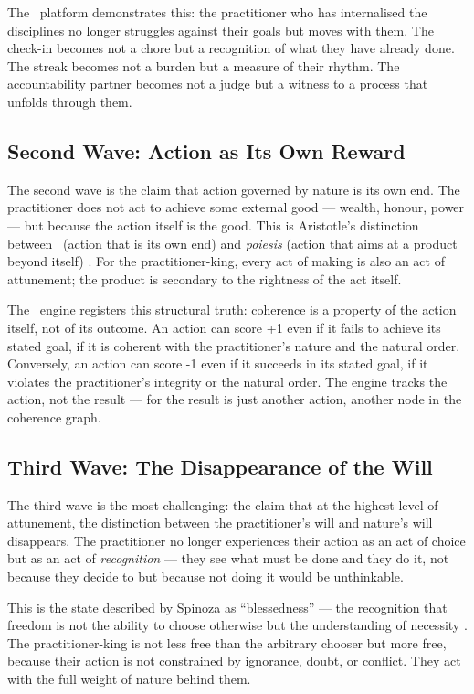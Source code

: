 The \praxis\ platform demonstrates this: the practitioner who has internalised
the disciplines no longer struggles against their goals but moves with them.
The check-in becomes not a chore but a recognition of what they have already
done. The streak becomes not a burden but a measure of their rhythm. The
accountability partner becomes not a judge but a witness to a process that
unfolds through them.

\subsection{Second Wave: Action as Its Own Reward}

The second wave is the claim that action governed by nature is its own end. The
practitioner does not act to achieve some external good --- wealth, honour,
power --- but because the action itself is the good. This is Aristotle's
distinction between \praxis\ (action that is its own end) and \emph{poiesis}
(action that aims at a product beyond itself) \parencite[VI.4]{aristotle2000ethics}. For the practitioner-king, every
act of making is also an act of attunement; the product is secondary to the
rightness of the act itself.

The \physis\ engine registers this structural truth: coherence is a property of
the action itself, not of its outcome. An action can score +1 even if it fails
to achieve its stated goal, if it is coherent with the practitioner's nature
and the natural order. Conversely, an action can score -1 even if it succeeds
in its stated goal, if it violates the practitioner's integrity or the natural
order. The engine tracks the action, not the result --- for the result is just
another action, another node in the coherence graph.

\subsection{Third Wave: The Disappearance of the Will}

The third wave is the most challenging: the claim that at the highest level of
attunement, the distinction between the practitioner's will and nature's will
disappears. The practitioner no longer experiences their action as an act of
choice but as an act of \emph{recognition} --- they see what must be done and
they do it, not because they decide to but because not doing it would be
unthinkable.

This is the state described by Spinoza as ``blessedness'' --- the recognition
that freedom is not the ability to choose otherwise but the understanding of
necessity \parencite[V.P42]{spinoza1994ethics}. The practitioner-king is not less free than the arbitrary chooser but
more free, because their action is not constrained by ignorance, doubt, or
conflict. They act with the full weight of nature behind them.


